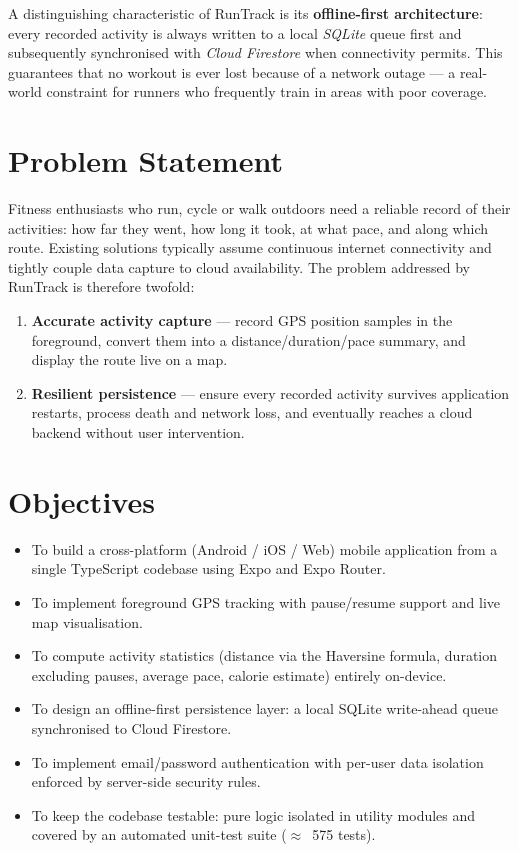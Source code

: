 \documentclass[11pt,a4paper]{report}
\begin{document}
A distinguishing characteristic of RunTrack is its \textbf{offline-first architecture}: every recorded activity is always written to a local \textit{SQLite} queue first and subsequently synchronised with \textit{Cloud Firestore} when connectivity permits. This guarantees that no workout is ever lost because of a network outage --- a real-world constraint for runners who frequently train in areas with poor coverage.

\section{Problem Statement}
Fitness enthusiasts who run, cycle or walk outdoors need a reliable record of their activities: how far they went, how long it took, at what pace, and along which route. Existing solutions typically assume continuous internet connectivity and tightly couple data capture to cloud availability. The problem addressed by RunTrack is therefore twofold:
\begin{enumerate}[nosep]
    \item \textbf{Accurate activity capture} --- record GPS position samples in the foreground, convert them into a distance/duration/pace summary, and display the route live on a map.
    \item \textbf{Resilient persistence} --- ensure every recorded activity survives application restarts, process death and network loss, and eventually reaches a cloud backend without user intervention.
\end{enumerate}

\section{Objectives}
\begin{itemize}[nosep]
    \item To build a cross-platform (Android / iOS / Web) mobile application from a single TypeScript codebase using Expo and Expo Router.
    \item To implement foreground GPS tracking with pause/resume support and live map visualisation.
    \item To compute activity statistics (distance via the Haversine formula, duration excluding pauses, average pace, calorie estimate) entirely on-device.
    \item To design an offline-first persistence layer: a local SQLite write-ahead queue synchronised to Cloud Firestore.
    \item To implement email/password authentication with per-user data isolation enforced by server-side security rules.
    \item To keep the codebase testable: pure logic isolated in utility modules and covered by an automated unit-test suite ($\approx$~575 tests).
\end{itemize}
\end{document}
